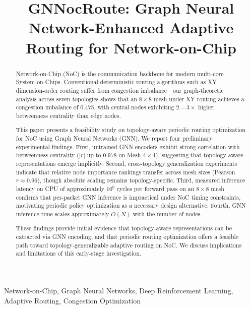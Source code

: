 \documentclass[conference]{IEEEtran}
\begin{document}
\title{GNNocRoute: Graph Neural Network-Enhanced Adaptive Routing for Network-on-Chip}

\author{
}

\maketitle

\begin{abstract}
Network-on-Chip (NoC) is the communication backbone for modern multi-core System-on-Chips. Conventional deterministic routing algorithms such as XY dimension-order routing suffer from congestion imbalance---our graph-theoretic analysis across seven topologies shows that an $8\times8$ mesh under XY routing achieves a congestion imbalance of 0.475, with central nodes exhibiting $2-3\times$ higher betweenness centrality than edge nodes.

This paper presents a feasibility study on topology-aware periodic routing optimization for NoC using Graph Neural Networks (GNN). We report four preliminary experimental findings. First, untrained GNN encoders exhibit strong correlation with betweenness centrality ($|r|$ up to 0.978 on Mesh $4\times4$), suggesting that topology-aware representations emerge implicitly. Second, cross-topology generalization experiments indicate that relative node importance rankings transfer across mesh sizes (Pearson $r \approx 0.96$), though absolute scaling remains topology-specific. Third, measured inference latency on CPU of approximately $10^6$ cycles per forward pass on an $8\times8$ mesh confirms that per-packet GNN inference is impractical under NoC timing constraints, motivating periodic policy optimization as a necessary design alternative. Fourth, GNN inference time scales approximately $O(N)$ with the number of nodes.

These findings provide initial evidence that topology-aware representations can be extracted via GNN encoding, and that periodic routing optimization offers a feasible path toward topology-generalizable adaptive routing on NoC. We discuss implications and limitations of this early-stage investigation.
\end{abstract}

\begin{IEEEkeywords}
Network-on-Chip, Graph Neural Networks, Deep Reinforcement Learning, Adaptive Routing, Congestion Optimization
\end{IEEEkeywords}
\end{document}
